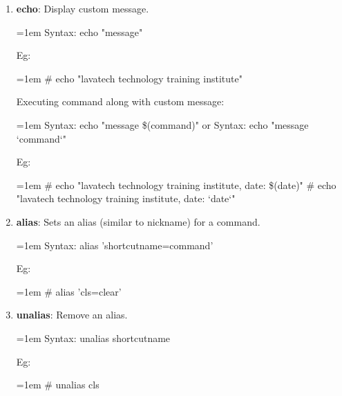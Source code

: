 \begin{flushleft}
\begin{enumerate}
		\item \textbf{echo}: Display custom message.
		\bigskip
		\begin{tcolorbox}[breakable,notitle,boxrule=1pt,colback=pink,colframe=pink]
			\color{black}
			\font=1em
			Syntax: echo "message"
			\font=4pt
		\end{tcolorbox}
		Eg:
		\bigskip		
		\begin{tcolorbox}[breakable,notitle,boxrule=1pt,colback=black,colframe=black]
			\color{green}
			\font=1em
			\# echo "lavatech technology training institute"
			\font=4pt
		\end{tcolorbox}
		Executing command along with custom message:
		\begin{tcolorbox}[breakable,notitle,boxrule=1pt,colback=pink,colframe=pink]
			\color{black}
			\font=1em
			Syntax: echo "message \$(command)"
			\newline
			or
			\newline
			Syntax: echo "message `command`"
			\font=4pt
		\end{tcolorbox}
		Eg:
		\bigskip		
		\begin{tcolorbox}[breakable,notitle,boxrule=1pt,colback=black,colframe=black]
			\color{green}
			\font=1em
			\# echo "lavatech technology training institute, date: \$(date)"
			\newline
			\# echo "lavatech technology training institute, date: `date`"
			\font=4pt
		\end{tcolorbox}
		\bigskip
		\bigskip	
		
		\item \textbf{alias}: Sets an alias (similar to nickname) for a command.
		\bigskip
		\begin{tcolorbox}[breakable,notitle,boxrule=1pt,colback=pink,colframe=pink]
			\color{black}
			\font=1em
			Syntax: alias 'shortcutname=command'
			\font=4pt
		\end{tcolorbox}
		Eg:
		\bigskip
		\begin{tcolorbox}[breakable,notitle,boxrule=1pt,colback=black,colframe=black]
			\color{green}
			\font=1em
			\# alias 'cls=clear'           
			\font=4pt
		\end{tcolorbox}
		\bigskip
		\bigskip	
		
		\item \textbf{unalias}: Remove an alias.
		\bigskip
		\begin{tcolorbox}[breakable,notitle,boxrule=1pt,colback=pink,colframe=pink]
			\color{black}
			\font=1em
			Syntax: unalias shortcutname
			\font=4pt
		\end{tcolorbox}
		Eg:
		\bigskip
		\begin{tcolorbox}[breakable,notitle,boxrule=1pt,colback=black,colframe=black]
			\color{green}
			\font=1em
			\# unalias cls
			\font=4pt
		\end{tcolorbox}
		\bigskip
		\bigskip	
		


\end{enumerate}
\end{flushleft}
